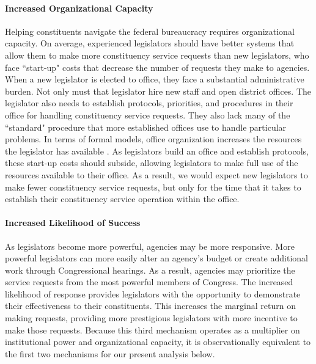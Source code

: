 \documentclass[12pt]{article}
\begin{document}
\paragraph{Increased Organizational Capacity} Helping constituents navigate the federal bureaucracy requires organizational capacity. On average, experienced legislators should have better systems that allow them to make more constituency service requests than new legislators, who face ``start-up" costs that decrease the number of requests they make to agencies. When a new legislator is elected to office, they face a substantial administrative burden. Not only must that legislator hire new staff and open district offices. The legislator also needs to establish protocols, priorities, and procedures in their office for handling constituency service requests. They also lack many of the ``standard" procedure that more established offices use to handle particular problems. In terms of formal models, office organization increases the resources the legislator has available \citep{AshworthBuenodeMesquita2006}. As legislators build an office and establish protocols, these start-up costs should subside, allowing legislators to make full use of the resources available to their office. As a result, we would expect new legislators to make fewer constituency service requests, but only for the time that it takes to establish their constituency service operation within the office.   


\paragraph{Increased Likelihood of Success} As legislators become more powerful, agencies may be more responsive. More powerful legislators can more easily alter an agency's budget or create additional work through Congressional hearings. As a result, agencies may prioritize the service requests from the most powerful members of Congress. %
The increased likelihood of response provides legislators with the opportunity to demonstrate their effectiveness to their constituents. This increases the marginal return on making requests, providing more prestigious legislators with more incentive to make those requests.  %
Because this third mechanism operates as a multiplier on institutional power and organizational capacity, it is observationally equivalent to the first two mechanisms for our present analysis below.
\end{document}
